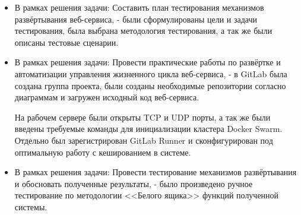 \begin{itemize}
    \item
    В рамках решения задачи: Составить план тестирования механизмов развёртывания веб-сервиса,
    - были сформулированы цели и задачи тестирования, была выбрана методология тестирования, а так же были описаны тестовые сценарии.

    \item
    В рамках решения задачи: Провести практические работы по развёртке и автоматизации управления жизненного цикла веб-сервиса,
    - в GitLab была создана группа проекта, были созданы необходимые репозитории согласно диаграммам и загружен исходный код веб-сервиса.

    На рабочем сервере были открыты TCP и UDP порты, а так же были введены требуемые команды для инициализации кластера Docker Swarm.
    Отдельно был зарегистрирован GitLab Runner и сконфигурирован под оптимальную работу с кешированием в системе.

    \item
    В рамках решения задачи: Провести тестирование механизмов развёртывания и обосновать полученные результаты,
    - было произведено ручное тестирование по методологии <<Белого ящика>> функций полученной системы.
\end{itemize}


